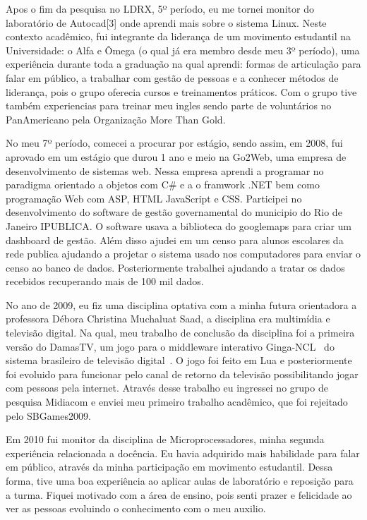 \documentclass[10pt,a4paper,oneside]{book}
\begin{document}
Apos o fim da pesquisa no LDRX, 5º período, eu me tornei monitor do laboratório de Autocad[3] 
onde aprendi mais sobre o sistema Linux. Neste contexto acadêmico, fui integrante da liderança de um  
movimento estudantil na Universidade: o Alfa e Ômega (o qual já era membro desde meu 3º período), 
uma experiência durante toda a graduação na qual aprendi:  formas de articulação para falar em público, 
a trabalhar com gestão de pessoas e a conhecer métodos de liderança, pois o grupo oferecia cursos e treinamentos práticos.  
Com o grupo tive também experiencias para treinar meu ingles sendo parte de voluntários no PanAmericano pela
Organização More Than Gold.

No meu 7º período, comecei a procurar por estágio, sendo assim, em 2008, fui aprovado em um estágio 
que durou 1 ano e meio na Go2Web, uma empresa de desenvolvimento de sistemas web. Nessa
empresa aprendi a programar no paradigma orientado a objetos com C\# e a o framwork .NET bem como 
programação Web com ASP, HTML JavaScript e CSS.
Participei no desenvolvimento do software de gestão governamental do municipio do Rio de Janeiro IPUBLICA.
O software usava a biblioteca do googlemaps para criar um dashboard de gestão.
Além disso ajudei em um censo para alunos escolares da rede publica ajudando a projetar o sistema usado nos computadores
para enviar o censo ao banco de dados.
Posteriormente trabalhei ajudando a tratar os dados recebidos recuperando mais de 100 mil dados.

No ano de 2009, eu fiz uma disciplina optativa com a minha futura orientadora a professora 
Débora Christina Muchaluat Saad, a disciplina era multimídia e televisão digital. Na qual,
meu trabalho de conclusão da disciplina foi a primeira versão do DamasTV, um jogo para o middleware 
interativo Ginga-NCL~\cite{soares2007ginga} do sistema brasileiro de televisão digital~\cite{mendes2007sbtvd}.
O jogo foi feito em Lua e posteriormente foi evoluido para funcionar pelo canal de retorno da televisão
possibilitando jogar com pessoas pela internet.
Através desse trabalho eu ingressei no grupo de pesquisa Midiacom e enviei meu primeiro trabalho acadêmico,
que foi rejeitado pelo SBGames2009.

Em 2010 fui monitor da disciplina de Microprocessadores,  minha segunda experiência 
relacionada a docência. Eu havia adquirido mais habilidade para falar em público, através da minha 
participação em movimento estudantil. Dessa forma,  tive uma boa experiência ao aplicar aulas de 
laboratório e reposição para a turma. Fiquei motivado com a área de ensino, pois senti prazer e 
felicidade ao ver as pessoas evoluindo o conhecimento com o meu auxilio. 
\end{document}

